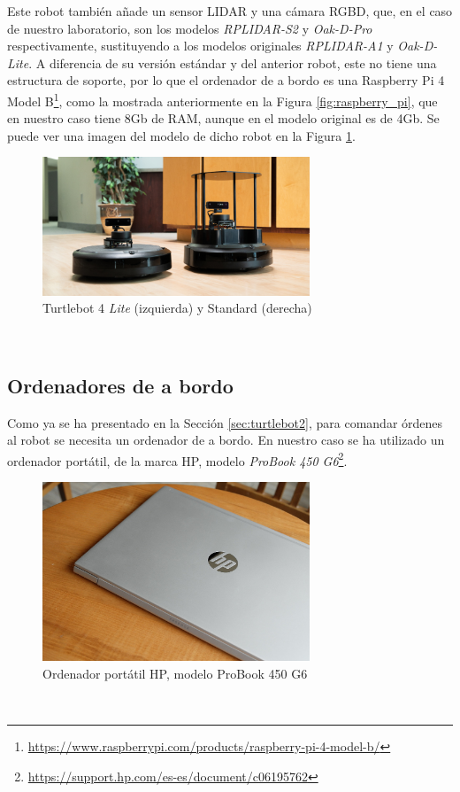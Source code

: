 Este robot también añade un sensor LIDAR y una cámara RGBD, que, en el caso de
nuestro laboratorio, son los modelos \textit{RPLIDAR-S2} y \textit{Oak-D-Pro}
respectivamente, sustituyendo a los modelos originales \textit{RPLIDAR-A1} y
\textit{Oak-D-Lite}.
A diferencia de su versión estándar y del anterior robot, este no tiene una
estructura de soporte, por lo que el ordenador de a bordo es una Raspberry
Pi 4 Model B\footnote{
\url{https://www.raspberrypi.com/products/raspberry-pi-4-model-b/}}, como la
mostrada anteriormente en la Figura \ref{fig:raspberry_pi}, que en nuestro caso
tiene 8Gb de RAM, aunque en el modelo original es de 4Gb.
Se puede ver una imagen del modelo de dicho robot en la Figura
\ref{fig:turtlebot4}.
\\

\begin{figure} [h!]
  \begin{center}
    \includegraphics[width=8cm]{figs/turtlebot4}
  \end{center}
  \caption{Turtlebot 4 \textit{Lite} (izquierda) y Standard (derecha) \citep{turtlebot4}}
  \label{fig:turtlebot4}
\end{figure}\


\subsection{Ordenadores de a bordo}
\label{sec:a_bordo}

Como ya se ha presentado en la Sección \ref{sec:turtlebot2}, para comandar
órdenes al robot se necesita un ordenador de a bordo.
En nuestro caso se ha utilizado un ordenador portátil, de la marca HP, modelo
\textit{ProBook 450 G6}\footnote{
\url{https://support.hp.com/es-es/document/c06195762}}.
\\

\begin{figure} [h!]
  \begin{center}
    \includegraphics[width=8cm]{figs/hp_probook}
  \end{center}
  \caption{Ordenador portátil HP, modelo ProBook 450 G6 \citep{hp_probook}}
  \label{fig:hp_probook}
\end{figure}\

